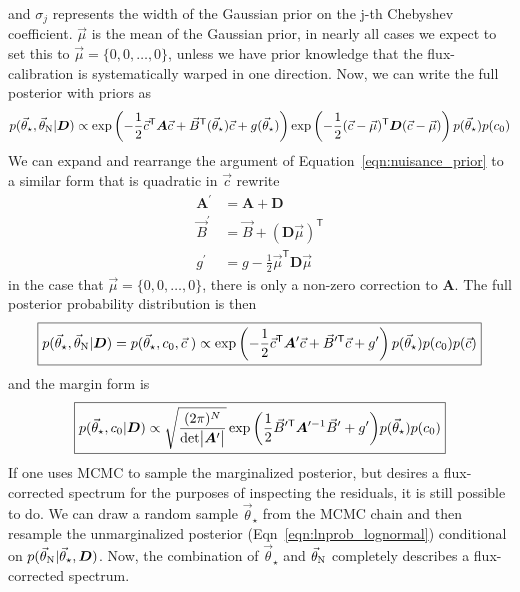 \documentclass[preprint]{aastex} %
\newcommand{\vt}{\vec{\theta}}
\newcommand{\vstar}{\vt_{\star}}
\newcommand{\vN}{\vt_{\rm N}}
\newcommand{\vc}{\vec{c}}
\newcommand{\fD}{ {\bm D}}
\newcommand{\trans}{\mathsf{T}}
\begin{document}
and $\sigma_j$ represents the width of the Gaussian prior on the j-th Chebyshev coefficient. $\vec{\mu}$ is the mean of the Gaussian prior, in nearly all cases we expect to set this to $\vec{\mu} = \{0, 0, \ldots, 0\}$, unless we have prior knowledge that the flux-calibration is systematically warped in one direction. Now, we can write the full posterior with priors as
\begin{equation}
  p(\vstar, \vN | \fD) \propto \exp \left ( - \frac{1}{2} \vc^\trans {\bm A} \vc + \vec{B}^\trans(\vstar) \vc + g(\vstar) \right )  \exp \left ( -\frac{1}{2} (\vc - \vec{\mu})^\trans {\bm D} (\vc - \vec{\mu}) \right ) p(\vstar) p(c_0)
  \label{eqn:posterior_prior}
\end{equation}
We can expand and rearrange the argument of Equation~\ref{eqn:nuisance_prior} to a similar form that is quadratic in $\vc$ rewrite
\begin{align}
  {\bm A}^\prime &= {\bm A} + {\bm D}\\
  \vec{B}^\prime &= \vec{B} + ({\bm D} \vec{\mu})^\trans\\
  g^\prime &= g - \frac{1}{2} \vec{\mu}^\trans {\bm D} \vec{\mu} 
\end{align}
in the case that $\vec{\mu} = \{0, 0, \ldots, 0\}$, there is only a non-zero correction to ${\bm A}$. The full posterior probability distribution is then
 \begin{equation}
   \boxed{
  p(\vstar, \vN | \fD) = p(\vstar, c_0, \vc\;) \propto \exp \left ( - \frac{1}{2} \vc^\trans {\bm A}^\prime \vc + \vec{B}^{\prime \trans} \vc + g^\prime \right ) p(\vstar) p(c_0) p(\vc)
}
\label{eqn:lnprob_lognormal}
\end{equation}
and the margin form is 
\begin{equation}
  \boxed{
  p(\vstar, c_0 | \fD) \propto \sqrt{\frac{(2 \pi )^N}{ {\rm det} \bigl |{\bm A}^\prime \bigr |}} \exp{ \left ( \frac{1}{2} \vec{B}^{\prime\trans} {\bm A}^{\prime -1} \vec{B}^\prime + g^\prime \right )} p(\vstar) p(c_0)
}
\label{eqn:lnprob_lognormal_marg}
\end{equation}
If one uses MCMC to sample the marginalized posterior, but desires a flux-corrected spectrum for the purposes of inspecting the residuals, it is still possible to do. We can draw a random sample $\vstar$ from the MCMC chain and then resample the unmarginalized posterior (Eqn~\ref{eqn:lnprob_lognormal}) conditional on $p(\vN | \vstar, \fD)$. Now, the combination of $\vstar$ and $\vN$ completely describes a flux-corrected spectrum.
\end{document}
